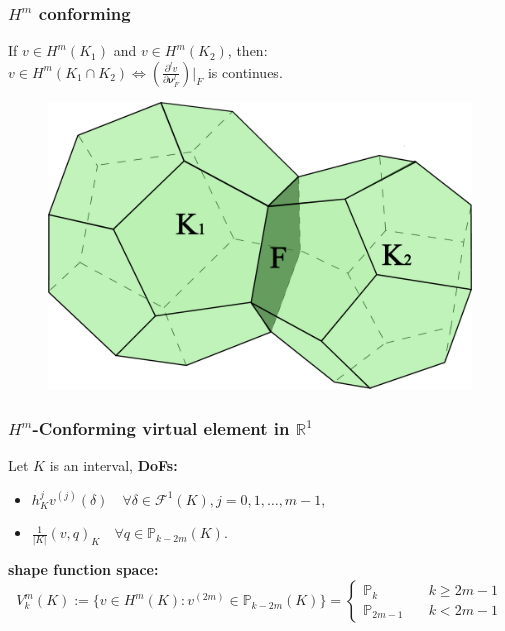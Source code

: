 \documentclass[notheorems,serif]{beamer}
\begin{document}
\begin{frame}
  \frametitle{$H^m$ conforming}
  If $v \in H^m(K_1)$ and $v \in H^m(K_2)$, then:\\
  \vspace{0.5cm}
  \centering
  $v \in H^m(K_1\cap K_2) \Longleftrightarrow  
  (\frac{\partial^l v}{\partial \boldsymbol{\nu}_F^l})|_F$ is continues.

  \begin{figure}[H]
    \centering
    \includegraphics[scale=0.2]{../figures/dodecahedron.pdf}
  \end{figure} 
\end{frame}


\begin{frame}
\frametitle{$H^m$-Conforming virtual element in $\mathbb{R}^1$}
Let $K$ is an interval, \bf{DoFs}:
\begin{itemize}
    \item $h_K^j v^{(j)}(\delta) \quad \forall \delta \in \mathcal{F}^1(K),
        j = 0, 1, \dots, m-1$,
    \item $\frac{1}{|K|}(v, q)_K \quad \forall q \in \mathbb{P}_{k-2m}(K)$. 
\end{itemize}
\bf{shape function space}:
$$
V_k^m(K) := \{v \in H^m(K): v^{(2m)}\in\mathbb{P}_{k-2m}(K)\} = 
\left\{ 
\begin{aligned}
    \mathbb{P}_{k} \quad & k\geq 2m-1\\
    \mathbb{P}_{2m-1} \quad & k < 2m-1
\end{aligned}
\right.
$$
\end{frame}
\end{document}
